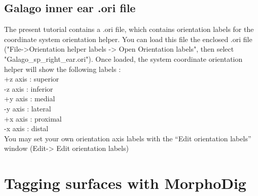 \documentclass[12pt, a4paper]{book}
\begin{document}
\subsection{Galago inner ear .ori file}
The present tutorial contains a .ori file, which contains orientation labels for the coordinate system
orientation helper. You can load this file the enclosed .ori file ("File->Orientation helper labels -> Open Orientation labels", then select
"Galago\_sp\_right\_ear.ori"). Once loaded, the system coordinate orientation helper will show the following
labels :\\
+z axis : superior\\
-z axis : inferior\\
+y axis : medial\\
-y axis : lateral\\
+x axis : proximal\\
-x axis : distal\\
You may set your own orientation axis labels with the “Edit orientation labels” window (Edit-> Edit orientation labels)

\section{Tagging surfaces with MorphoDig}
\end{document}
